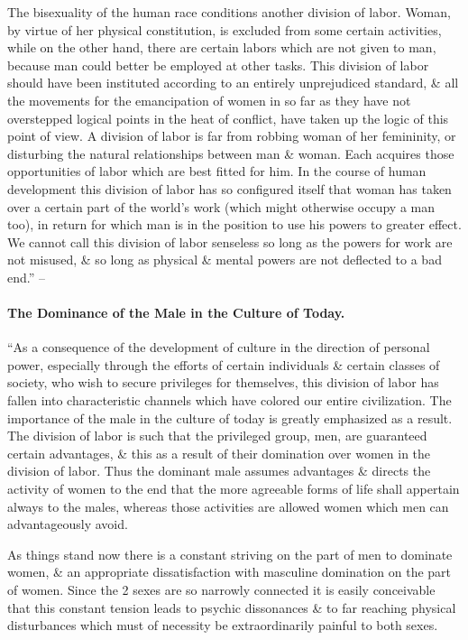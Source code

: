 \documentclass{article}
\begin{document}
The bisexuality of the human race conditions another division of labor. Woman, by virtue of her physical constitution, is excluded from some certain activities, while on the other hand, there are certain labors which are not given to man, because man could better be employed at other tasks. This division of labor should have been instituted according to an entirely unprejudiced standard, \& all the movements for the emancipation of women in so far as they have not overstepped logical points in the heat of conflict, have taken up the logic of this point of view. A division of labor is far from robbing woman of her femininity, or disturbing the natural relationships between man \& woman. Each acquires those opportunities of labor which are best fitted for him. In the course of human development this division of labor has so configured itself that woman has taken over a certain part of the world's work (which might otherwise occupy a man too), in return for which man is in the position to use his powers to greater effect. We cannot call this division of labor senseless so long as the powers for work are not misused, \& so long as physical \& mental powers are not deflected to a bad end.'' -- \cite[pp. 120--122]{Adler_human_nature}

\paragraph{The Dominance of the Male in the Culture of Today.} ``As a consequence of the development of culture in the direction of personal power, especially through the efforts of certain individuals \& certain classes of society, who wish to secure privileges for themselves, this division of labor has fallen into characteristic channels which have colored our entire civilization. The importance of the male in the culture of today is greatly emphasized as a result. The division of labor is such that the privileged group, men, are guaranteed certain advantages, \& this as a result of their domination over women in the division of labor. Thus the dominant male assumes advantages \& directs the activity of women to the end that the more agreeable forms of life shall appertain always to the males, whereas those activities are allowed women which men can advantageously avoid.

As things stand now there is a constant striving on the part of men to dominate women, \& an appropriate dissatisfaction with masculine domination on the part of women. Since the 2 sexes are so narrowly connected it is easily conceivable that this constant tension leads to psychic dissonances \& to far reaching physical disturbances which must of necessity be extraordinarily painful to both sexes.
\end{document}
